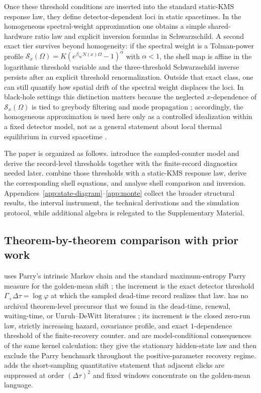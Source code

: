 \documentclass[11pt]{article}
\theoremstyle{definition}
\begin{document}
Once these threshold conditions are inserted into the standard static-KMS response law, they define detector-dependent loci in static spacetimes. In the homogeneous spectral-weight approximation one obtains a simple shared-hardware ratio law and explicit inversion formulas in Schwarzschild. A second exact tier survives beyond homogeneity: if the spectral weight is a Tolman-power profile $\mathcal S_x(\Omega)=K(e^{\beta_\infty N(x)\Omega}-1)^\alpha$ with $\alpha<1$, the shell map is affine in the logarithmic threshold variable and the three-threshold Schwarzschild inverse persists after an explicit threshold renormalization. Outside that exact class, one can still quantify how spatial drift of the spectral weight displaces the loci. In black-hole settings this distinction matters because the neglected $x$-dependence of $\mathcal S_x(\Omega)$ is tied to greybody filtering and mode propagation \cite{Page1976Emission,ArbeyCalzaPerez2025}; accordingly, the homogeneous approximation is used here only as a controlled idealization within a fixed detector model, not as a general statement about local thermal equilibrium in curved spacetime \cite{BuchholzSchlemmer2007,Solveen2012,GranseePinamontiVerch2017}.

The paper is organized as follows.  introduce the sampled-counter model and derive the record-level thresholds together with the finite-record diagnostics needed later.  combine those thresholds with a static-KMS response law, derive the corresponding shell equations, and analyse shell comparison and inversion. Appendices~\ref{app:state-diagram}--\ref{app:monte} collect the broader structural results, the interval instrument, the technical derivations and the simulation protocol, while additional algebra is relegated to the Supplementary Material.

\subsection{Theorem-by-theorem comparison with prior work}

 uses Parry's intrinsic Markov chain and the standard maximum-entropy Parry measure for the golden-mean shift \cite{Parry1964,LindMarcus1995}; the increment is the exact detector threshold $\Gamma_+\Delta\tau=\log\varphi$ at which the sampled dead-time record realizes that law.  has no archival theorem-level precursor that we found in the dead-time, renewal, waiting-time, or Unruh--DeWitt literatures \cite{Muller1973,CantorTeich1975,CarmichaelWaiting1989,Brandes2008}; its increment is the closed zero-run law, strictly increasing hazard, covariance profile, and exact $1$-dependence threshold of the finite-recovery counter.  and  are model-conditional consequences of the same kernel calculation: they give the stationary hidden-state law and then exclude the Parry benchmark throughout the positive-parameter recovery regime.  adds the short-sampling quantitative statement that adjacent clicks are suppressed at order $(\Delta\tau)^2$ and fixed windows concentrate on the golden-mean language.
\end{document}
